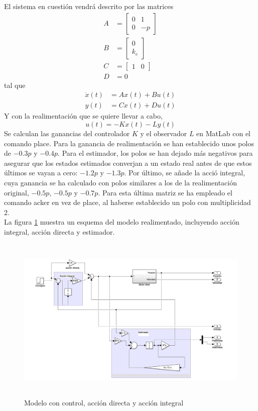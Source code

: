 \documentclass[a4paper, 12pt]{article}
\begin{document}
El sistema en cuestión vendrá descrito por las matrices
\begin{align}
		A &= \begin{bmatrix} 0 & 1 \\ 0 & -p \end{bmatrix}  \nonumber\\
		B &=  \begin{bmatrix} 0 \\ k_e \end{bmatrix}  \nonumber\\
		C &= \begin{bmatrix} 1 & 0 \end{bmatrix}  \nonumber\\
		D &= 0 \nonumber
\end{align}
tal que 
\begin{align}\label{sistema}
	\dot x(t) &= A x(t) + B u(t) \\
	y(t) &= Cx(t) + Du(t) \label{sistema2}
\end{align}
Y con la realimentación que se quiere llevar a cabo, 
\begin{equation}
	u(t) = -Kx(t) - Ly(t)
\end{equation}
Se calculan las ganancias del controlador $K$ y el observador $L$ en MatLab con el comando place. Para la ganancia de realimentación se han establecido unos polos de $-0.3p$ y $-0.4p$. 
Para el estimador, los polos se han dejado más negativos para asegurar que los estados estimados converjan a un estado real antes de que estos últimos se vayan a cero: $-1.2p$ y $-1.3p$.
Por último, se añade la acció integral, cuya ganancia se ha calculado con polos similares a los de la realimentación original, $-0.5p$, $-0.5p$ y $-0.7p$. Para esta última matriz se ha empleado el comando acker en vez de place, al haberse establecido un polo con multiplicidad 2. \\

La figura \ref{realimentado} muestra un esquema del modelo realimentado, incluyendo acción integral, acción directa y estimador.
\begin{figure}[H] 
	\centering
	\includegraphics[height=8cm]{figs/p4/realimentado} 
	\caption{Modelo con control, acción directa y acción integral} \label{realimentado}
\end{figure}
\end{document}
